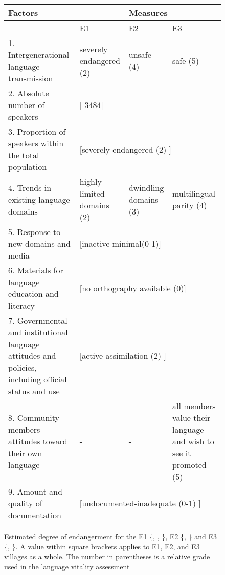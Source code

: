 \begin{sidewaysfigure}
\footnotesize
  \centering
 \begin{tabular}{p{5cm}p{3.5cm}p{3.5cm}p{3.5cm}}


\toprule
    Factors & \multicolumn{3}{c}{Measures}\\[1ex]\midrule
 &E1&E2&E3\\[1ex]\midrule

1. Intergenerational language transmission &  {severely endangered} 
(2) & {unsafe} (4)& {safe} (5)\\

2.  Absolute number of speakers  &
\multicolumn{3}{l}{[{ 3484}]}\\ 

3. Proportion of speakers within the total population &
\multicolumn{3}{l}{[{severely
endangered}  (2) ]}\\

4.  Trends in existing language domains & {highly limited domains}
(2)& {dwindling domains} (3)&{multilingual parity} (4)\\


5.  Response to new domains and media & 
\multicolumn{3}{l}{[{inactive-minimal}(0-1)]}\\

6.  Materials for language education and literacy & 
\multicolumn{3}{l}{[{no {orthography} available} (0)]}\\

7. Governmental and institutional language attitudes
and policies, including official status and use &
\multicolumn{3}{l}{[{active
assimilation} (2) ]}\\


8. Community members attitudes toward their own language &-&-&{all
members value their language and wish to see it promoted} (5) 
\\

9.  Amount and quality of documentation &
\multicolumn{3}{l}{[{undocumented-inadequate} (0-1) ]}\\


\bottomrule
  \end{tabular}
  
\caption[Estimated degree of endangerment for the E1, E2, and E3 
villages]{Estimated degree of endangerment for the E1 \{, , \}, 
E2 \{, \} and E3 \{, \}. A value within square brackets 
 applies to E1, E2, and E3 villages as a whole. The number in parentheses is a 
relative grade used in the  language vitality assessment  
\citep[see][7]{Reco03}} \label{tab:estimate-endangerment}

\end{sidewaysfigure}



